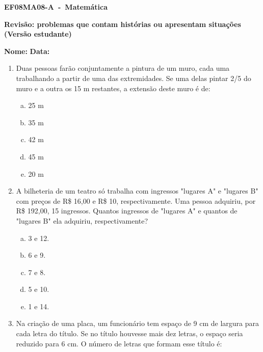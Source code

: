 \documentclass[a4paper,14pt]{article}
\begin{document}
	
	\noindent\textbf{EF08MA08-A~-~Matemática} 
	
	\begin{center}
		\textbf{Revisão: problemas que contam histórias ou apresentam situações (Versão estudante)}
	\end{center}
	
	
	\noindent\textbf{Nome:} \underline{\hspace{10cm}}
    \noindent\textbf{Data:} \underline{\hspace{4cm}}
	
	
	\begin{multicols}{2}
	\begin{enumerate}	
		\item Duas pessoas farão conjuntamente a pintura de um muro, cada uma trabalhando a partir de uma das extremidades. Se uma delas pintar 2/5 do muro e a outra os 15 m restantes, a extensão deste muro é de: 
		\begin{enumerate}[a)]
			\item 25 m
			\item 35 m
			\item 42 m
			\item 45 m
			\item 20 m
	    \end{enumerate}
        \item A bilheteria de um teatro só trabalha com ingressos "lugares A" e "lugares B" com preços de R\$ 16,00 e R\$ 10, respectivamente. Uma pessoa adquiriu, por R\$ 192,00, 15 ingressos. Quantos ingressos de "lugares A" e quantos de "lugares B" ela adquiriu, respectivamente?
        \begin{enumerate}[a)]
        	\item 3 e 12.
        	\item 6 e 9.
        	\item 7 e 8.
        	\item 5 e 10.
        	\item 1 e 14.
        \end{enumerate}
        \item Na criação de uma placa, um funcionário tem espaço de 9 cm de largura para cada letra do título. Se no título houvesse mais dez letras, o espaço seria reduzido para 6 cm. O número de letras que formam esse título é:

\end{enumerate}
\end{multicols}
\end{document}
